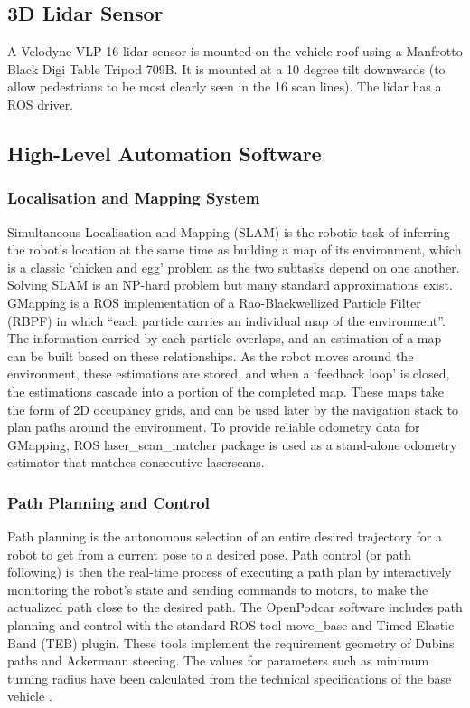\documentclass[a4paper]{article}
\begin{document}
	\subsection{3D Lidar Sensor}
	A Velodyne VLP-16 lidar sensor is mounted on the vehicle roof using a Manfrotto Black Digi Table Tripod 709B. It is mounted at a 10 degree tilt downwards (to allow pedestrians to be most clearly seen in the 16 scan lines). The lidar has a ROS driver. 
	
	\subsection{High-Level Automation Software}
	
	
	\subsubsection{Localisation and Mapping System}
	
	Simultaneous Localisation and Mapping (SLAM) \cite{thrun2002probabilistic} is the robotic task of inferring the robot’s location at the same time as building a map of its environment, which is a classic `chicken and egg’ problem as the two subtasks depend on one another. Solving SLAM is an NP-hard problem but many standard approximations exist. GMapping \cite{yuen2017improved} is a ROS implementation of a Rao-Blackwellized Particle Filter (RBPF) in which ``each particle carries an individual map of the environment''. The information carried by each particle overlaps, and an estimation of a map can be built based on these relationships. As the robot moves around the environment, these estimations are stored, and when a ‘feedback loop’ is closed, the estimations cascade into a portion of the completed map. These maps take the form of 2D occupancy grids, and can be used later by the navigation stack to plan paths around the environment.  To provide reliable odometry data for GMapping, ROS laser\_scan\_matcher package is used  as a stand-alone odometry estimator that matches consecutive laserscans.
	
	
	\subsubsection{Path Planning and Control}
	
	Path planning is the autonomous selection of an entire desired trajectory for a robot to get from a current pose to a desired pose. Path control (or path following) is then the real-time process of executing a path plan by interactively monitoring the robot’s state and sending commands to motors, to make the actualized path close to the desired path. The OpenPodcar software includes path planning and control with the standard ROS tool move\_base and Timed Elastic Band (TEB) \cite{rosmann2013efficient} plugin. These tools implement the requirement geometry of Dubins paths \cite{dubins1957curves} and Ackermann steering. The values for parameters such as minimum turning radius have been calculated from the technical specifications of the base vehicle \cite{shoprider2016shoprider}.
	
\end{document}

